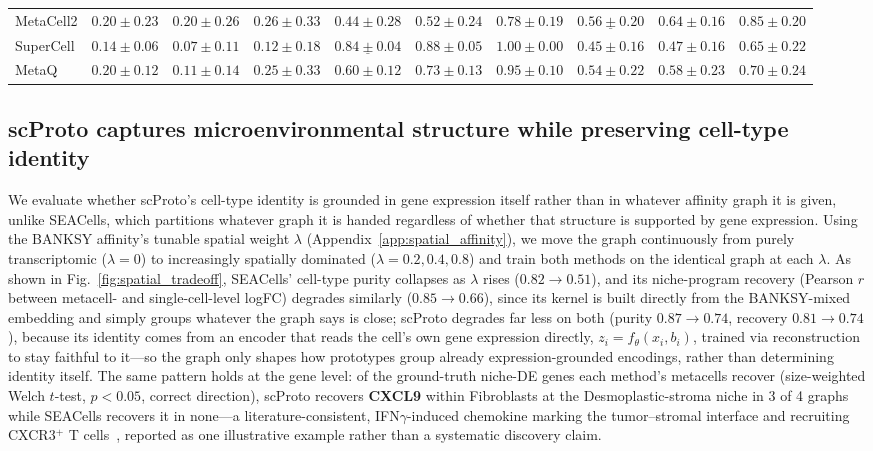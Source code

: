 \begin{table}[t]
{\begin{tabular}{lccc|ccc|ccc}
MetaCell2
& $0.20 \pm 0.23$
& $0.20 \pm 0.26$
& $0.26 \pm 0.33$
& $0.44 \pm 0.28$
& $0.52 \pm 0.24$
& $0.78 \pm 0.19$
& $\underline{0.56 \pm 0.20}$
& $\mathbf{0.64 \pm 0.16}$
& $\mathbf{0.85 \pm 0.20}$ \\

SuperCell
& $0.14 \pm 0.06$
& $0.07 \pm 0.11$
& $0.12 \pm 0.18$
& $\underline{0.84 \pm 0.04}$
& $\mathbf{0.88 \pm 0.05}$
& $1.00 \pm 0.00$
& $0.45 \pm 0.16$
& $0.47 \pm 0.16$
& $0.65 \pm 0.22$ \\

MetaQ
& $0.20 \pm 0.12$
& $0.11 \pm 0.14$
& $0.25 \pm 0.33$
& $0.60 \pm 0.12$
& $0.73 \pm 0.13$
& $0.95 \pm 0.10$
& $0.54 \pm 0.22$
& $0.58 \pm 0.23$
& $0.70 \pm 0.24$ \\
\bottomrule
\end{tabular}%
}
\setlength{\tabcolsep}{6pt}
\end{table}

\subsection{scProto captures microenvironmental structure while preserving cell-type identity}

We evaluate whether scProto's cell-type identity is grounded in gene expression itself rather than in whatever affinity graph it is given, unlike SEACells, which partitions whatever graph it is handed regardless of whether that structure is supported by gene expression. Using the BANKSY affinity's tunable spatial weight $\lambda$ (Appendix~\ref{app:spatial_affinity}), we move the graph continuously from purely transcriptomic ($\lambda{=}0$) to increasingly spatially dominated ($\lambda{=}0.2,0.4,0.8$) and train both methods on the identical graph at each $\lambda$. As shown in Fig.~\ref{fig:spatial_tradeoff}, SEACells' cell-type purity collapses as $\lambda$ rises ($0.82\to0.51$), and its niche-program recovery (Pearson $r$ between metacell- and single-cell-level logFC) degrades similarly ($0.85\to0.66$), since its kernel is built directly from the BANKSY-mixed embedding and simply groups whatever the graph says is close; scProto degrades far less on both (purity $0.87\to0.74$, recovery $0.81\to0.74$), because its identity comes from an encoder that reads the cell's own gene expression directly, $z_i = f_\theta(x_i, b_i)$, trained via reconstruction to stay faithful to it---so the graph only shapes how prototypes group already expression-grounded encodings, rather than determining identity itself. The same pattern holds at the gene level: of the ground-truth niche-DE genes each method's metacells recover (size-weighted Welch $t$-test, $p<0.05$, correct direction), scProto recovers \textbf{CXCL9} within Fibroblasts at the Desmoplastic-stroma niche in 3 of 4 graphs while SEACells recovers it in none---a literature-consistent, IFN$\gamma$-induced chemokine marking the tumor--stromal interface and recruiting CXCR3$^+$ T cells~\citep{chow2019cxcr3}, reported as one illustrative example rather than a systematic discovery claim.

